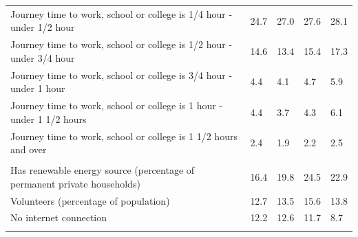 \documentclass{article}
\begin{document}
\begin{table}[h]
\begin{tabular}{KTTTT}
Journey time to work, school or college is 1/4 hour - under 1/2 hour & 24.7& 27.0& 27.6& 28.1\\
Journey time to work, school or college is 1/2 hour - under 3/4 hour & 14.6& 13.4& 15.4& 17.3\\
Journey time to work, school or college is 3/4 hour - under 1 hour & 4.4& 4.1& 4.7& 5.9\\
Journey time to work, school or college is 1 hour - under 1 1/2 hours & 4.4& 3.7& 4.3& 6.1\\
Journey time to work, school or college is 1 1/2 hours and over & 2.4& 1.9& 2.2& 2.5\\
\hline
    \\ 
    \hline
Has renewable energy source (percentage of permanent private households) & 16.4& 19.8& 24.5& 22.9\\
    \hline
Volunteers (percentage of population) & 12.7& 13.5& 15.6& 13.8\\
    \hline
No internet connection& 12.2& 12.6& 11.7&  8.7\\
\hline
\end{tabular}
\end{table}
\end{document}
